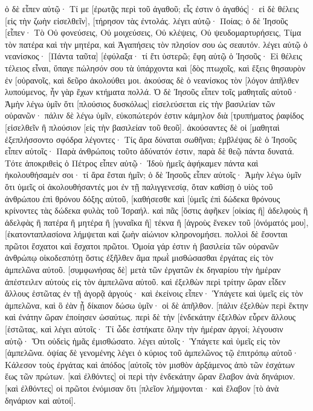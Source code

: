 ὁ δὲ εἶπεν αὐτῷ· Τί με [ἐρωτᾷς περὶ τοῦ ἀγαθοῦ; εἷς ἐστιν ὁ ἀγαθός]· εἰ δὲ θέλεις [εἰς τὴν ζωὴν εἰσελθεῖν], [τήρησον τὰς ἐντολάς. 
λέγει αὐτῷ· Ποίας; ὁ δὲ Ἰησοῦς [εἶπεν· Τὸ Οὐ φονεύσεις, Οὐ μοιχεύσεις, Οὐ κλέψεις, Οὐ ψευδομαρτυρήσεις, 
Τίμα τὸν πατέρα καὶ τὴν μητέρα, καὶ Ἀγαπήσεις τὸν πλησίον σου ὡς σεαυτόν. 
λέγει αὐτῷ ὁ νεανίσκος· [Πάντα ταῦτα] [ἐφύλαξα· τί ἔτι ὑστερῶ; 
ἔφη αὐτῷ ὁ Ἰησοῦς· Εἰ θέλεις τέλειος εἶναι, ὕπαγε πώλησόν σου τὰ ὑπάρχοντα καὶ [δὸς πτωχοῖς, καὶ ἕξεις θησαυρὸν ἐν [οὐρανοῖς, καὶ δεῦρο ἀκολούθει μοι. 
ἀκούσας δὲ ὁ νεανίσκος τὸν [λόγον ἀπῆλθεν λυπούμενος, ἦν γὰρ ἔχων κτήματα πολλά. 
Ὁ δὲ Ἰησοῦς εἶπεν τοῖς μαθηταῖς αὐτοῦ· Ἀμὴν λέγω ὑμῖν ὅτι [πλούσιος δυσκόλως] εἰσελεύσεται εἰς τὴν βασιλείαν τῶν οὐρανῶν· 
πάλιν δὲ λέγω ὑμῖν, εὐκοπώτερόν ἐστιν κάμηλον διὰ [τρυπήματος ῥαφίδος [εἰσελθεῖν ἢ πλούσιον [εἰς τὴν βασιλείαν τοῦ θεοῦ]. 
ἀκούσαντες δὲ οἱ [μαθηταὶ ἐξεπλήσσοντο σφόδρα λέγοντες· Τίς ἄρα δύναται σωθῆναι; 
ἐμβλέψας δὲ ὁ Ἰησοῦς εἶπεν αὐτοῖς· Παρὰ ἀνθρώποις τοῦτο ἀδύνατόν ἐστιν, παρὰ δὲ θεῷ πάντα δυνατά. 
Τότε ἀποκριθεὶς ὁ Πέτρος εἶπεν αὐτῷ· Ἰδοὺ ἡμεῖς ἀφήκαμεν πάντα καὶ ἠκολουθήσαμέν σοι· τί ἄρα ἔσται ἡμῖν; 
ὁ δὲ Ἰησοῦς εἶπεν αὐτοῖς· Ἀμὴν λέγω ὑμῖν ὅτι ὑμεῖς οἱ ἀκολουθήσαντές μοι ἐν τῇ παλιγγενεσίᾳ, ὅταν καθίσῃ ὁ υἱὸς τοῦ ἀνθρώπου ἐπὶ θρόνου δόξης αὐτοῦ, [καθήσεσθε καὶ [ὑμεῖς ἐπὶ δώδεκα θρόνους κρίνοντες τὰς δώδεκα φυλὰς τοῦ Ἰσραήλ. 
καὶ πᾶς [ὅστις ἀφῆκεν [οἰκίας ἢ] ἀδελφοὺς ἢ ἀδελφὰς ἢ πατέρα ἢ μητέρα ἢ [γυναῖκα ἢ] τέκνα ἢ [ἀγροὺς ἕνεκεν τοῦ [ὀνόματός μου], [ἑκατονταπλασίονα λήμψεται καὶ ζωὴν αἰώνιον κληρονομήσει. 
πολλοὶ δὲ ἔσονται πρῶτοι ἔσχατοι καὶ ἔσχατοι πρῶτοι. 
Ὁμοία γάρ ἐστιν ἡ βασιλεία τῶν οὐρανῶν ἀνθρώπῳ οἰκοδεσπότῃ ὅστις ἐξῆλθεν ἅμα πρωῒ μισθώσασθαι ἐργάτας εἰς τὸν ἀμπελῶνα αὐτοῦ. 
[συμφωνήσας δὲ] μετὰ τῶν ἐργατῶν ἐκ δηναρίου τὴν ἡμέραν ἀπέστειλεν αὐτοὺς εἰς τὸν ἀμπελῶνα αὐτοῦ. 
καὶ ἐξελθὼν περὶ τρίτην ὥραν εἶδεν ἄλλους ἑστῶτας ἐν τῇ ἀγορᾷ ἀργούς· 
καὶ ἐκείνοις εἶπεν· Ὑπάγετε καὶ ὑμεῖς εἰς τὸν ἀμπελῶνα, καὶ ὃ ἐὰν ᾖ δίκαιον δώσω ὑμῖν· 
οἱ δὲ ἀπῆλθον. [πάλιν ἐξελθὼν περὶ ἕκτην καὶ ἐνάτην ὥραν ἐποίησεν ὡσαύτως. 
περὶ δὲ τὴν [ἑνδεκάτην ἐξελθὼν εὗρεν ἄλλους [ἑστῶτας, καὶ λέγει αὐτοῖς· Τί ὧδε ἑστήκατε ὅλην τὴν ἡμέραν ἀργοί; 
λέγουσιν αὐτῷ· Ὅτι οὐδεὶς ἡμᾶς ἐμισθώσατο. λέγει αὐτοῖς· Ὑπάγετε καὶ ὑμεῖς εἰς τὸν [ἀμπελῶνα. 
ὀψίας δὲ γενομένης λέγει ὁ κύριος τοῦ ἀμπελῶνος τῷ ἐπιτρόπῳ αὐτοῦ· Κάλεσον τοὺς ἐργάτας καὶ ἀπόδος [αὐτοῖς τὸν μισθὸν ἀρξάμενος ἀπὸ τῶν ἐσχάτων ἕως τῶν πρώτων. 
[καὶ ἐλθόντες] οἱ περὶ τὴν ἑνδεκάτην ὥραν ἔλαβον ἀνὰ δηνάριον. 
[καὶ ἐλθόντες] οἱ πρῶτοι ἐνόμισαν ὅτι [πλεῖον λήμψονται· καὶ ἔλαβον [τὸ ἀνὰ δηνάριον καὶ αὐτοί]. 
